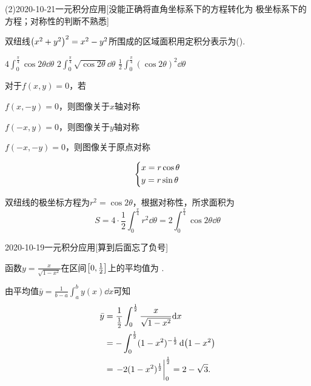 \documentclass{ctexart}
\begin{document}
\begin{mathques}(2){2020-10-21}{一元积分应用}[没能正确将直角坐标系下的方程转化为
  极坐标系下的方程；对称性的判断不熟悉]
\begin{ques}
  双纽线$\qty(x^2 + y^2)^2 = x^2 - y^2$所围成的区域面积用定积分表示为(\quad).
  \begin{multichoice}
    \task {}
    \task $4\int_{0}^{\frac{\pi}{4}}\cos 2\theta\dd \theta$
    \task $2\int_{0}^{\frac{\pi}{4}}\sqrt{\cos 2\theta}\dd \theta$
    \task $\frac{1}{2}\int_{0}^{\frac{\pi}{4}}(\cos 2\theta)^2\dd \theta$
  \end{multichoice}
\end{ques}
\begin{solu}
  \begin{mathideabox}[对称性]
    对于$f(x, y) = 0$，若
    \begin{solulist}
      \item $f(x, -y) = 0$，则图像关于$x$轴对称
      \item $f(-x, y) = 0$，则图像关于$y$轴对称
      \item $f(-x, -y) = 0$，则图像关于原点对称
    \end{solulist}
    \[
    \begin{dcases}
    x = r\cos\theta\\
    y = r\sin\theta
    \end{dcases}
    \]
  \end{mathideabox}
  双纽线的极坐标方程为$r^2 = \cos 2\theta$，根据对称性，所求面积为
  \[
  S = 4\cdot \frac{1}{2}\int_{0}^{\frac{\pi}{4}} r^2\dd \theta = 2\int_{0}
  ^{\frac{\pi}{4}}\cos 2\theta\dd \theta
  \]
\end{solu}
\end{mathques}

\begin{mathques}{2020-10-19}{一元积分应用}[算到后面忘了负号]
\begin{ques}
  函数$y = \frac{x}{\sqrt{1 - x^2}}$在区间$\qty[0, \frac{1}{2}]$上的平均值为
  \mathblank.
\end{ques}
\begin{solu}

  由平均值$\bar{y} = \frac{1}{b - a}\int_{a}^{b}y(x)\dd x$可知
  \begin{align*}
    \bar{y} &= \frac{1}{\frac{1}{2}}\int_{0}^{\frac{1}{2}} \frac{x}{\sqrt{1 -
    x^2}}\dd x\\
    &= - \int_{0}^{\frac{1}{2}}(1 - x^2)^{-\frac{1}{2}} \dd(1 - x^2)\\
    &=\eval{-2(1 - x^2)^{\frac{1}{2}}}_0^{\frac{1}{2}} = 2 - \sqrt{3}.
  \end{align*}
\end{solu}
\end{mathques}
\end{document}
